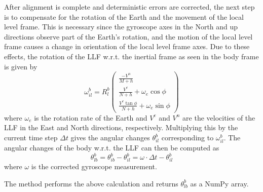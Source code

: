 \documentclass[11pt, oneside]{article}   	%
\begin{document}
After alignment is complete and deterministic errors are corrected, the next step is to compensate for the rotation of the Earth and the movement of the local level frame.  This is necessary since the gyroscope axes in the North and up directions observe part of the Earth's rotation, and the motion of the local level frame causes a change in orientation of the local level frame axes.  Due to these effects, the rotation of the LLF w.r.t. the inertial frame as seen in the body frame is given by 
\begin{equation}
\omega_{il}^b=R_l^b\begin{pmatrix}
\frac{-V^n}{M+h} \\[.1cm]
\frac{V^e}{N+h}+\omega_e \cos\phi \\[.1cm]
\frac{V^e\tan\phi}{N+h}+\omega_e \sin\phi
\end{pmatrix}
\end{equation}
where $\omega_e$ is the rotation rate of the Earth and $V^e$ and $V^n$ are the velocities of the LLF in the East and North directions, respectively.  Multiplying this by the current time step $\Delta t$ gives the angular changes $\theta_{il}^b$ corresponding to $\omega_{il}^b$.  The angular changes of the body w.r.t. the LLF can then be computed as 
\begin{equation}
\theta_{lb}^b=\theta_{ib}^b-\theta_{il}^b=\omega\cdot\Delta t-\theta_{il}^b
\end{equation}
where $\omega$ is the corrected gyroscope measurement.

The  method performs the above calculation and returns $\theta_{lb}^b$ as a NumPy array.
\end{document}
